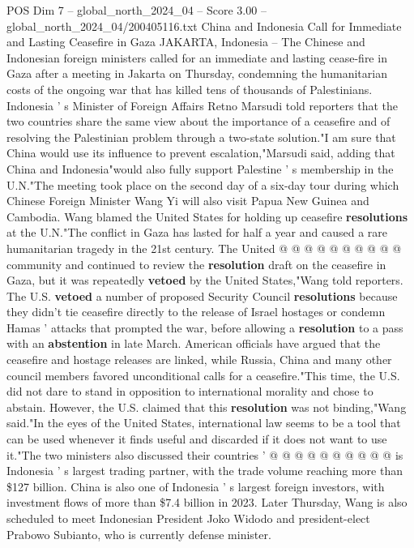 \begin{textsample}{POS Dim 7 – global\_north\_2024\_04 – Score 3.00 – global\_north\_2024\_04/200405116.txt}  \label{ex:f7_pos_223}
China and Indonesia Call for Immediate and Lasting Ceasefire in Gaza JAKARTA, Indonesia -- The Chinese and Indonesian foreign ministers called for an immediate and lasting cease-fire in Gaza after a meeting in Jakarta on Thursday, condemning the humanitarian costs of the ongoing war that has killed tens of thousands of Palestinians.
Indonesia ' s Minister of Foreign Affairs Retno Marsudi told reporters that the two countries share the same view about the importance of a ceasefire and of resolving the Palestinian problem through a two-state solution."I am sure that China would use its influence to prevent escalation,"Marsudi said, adding that China and Indonesia"would also fully support Palestine ' s membership in the U.N."The meeting took place on the second day of a six-day tour during which Chinese Foreign Minister Wang Yi will also visit Papua New Guinea and Cambodia.
Wang blamed the United States for holding up ceasefire \textbf{resolutions} at the U.N."The conflict in Gaza has lasted for half a year and caused a rare humanitarian tragedy in the 21st century.
The United @ @ @ @ @ @ @ @ @ @ community and continued to review the \textbf{resolution} draft on the ceasefire in Gaza, but it was repeatedly \textbf{vetoed} by the United States,"Wang told reporters.
The U.S. \textbf{vetoed} a number of proposed Security Council \textbf{resolutions} because they didn't tie ceasefire directly to the release of Israel hostages or condemn Hamas ' attacks that prompted the war, before allowing a \textbf{resolution} to a pass with an \textbf{abstention} in late March.
American officials have argued that the ceasefire and hostage releases are linked, while Russia, China and many other council members favored unconditional calls for a ceasefire."This time, the U.S. did not dare to stand in opposition to international morality and chose to abstain.
However, the U.S. claimed that this \textbf{resolution} was not binding,"Wang said."In the eyes of the United States, international law seems to be a tool that can be used whenever it finds useful and discarded if it does not want to use it."The two ministers also discussed their countries ' @ @ @ @ @ @ @ @ @ @ is Indonesia ' s largest trading partner, with the trade volume reaching more than \$127 billion.
China is also one of Indonesia ' s largest foreign investors, with investment flows of more than \$7.4 billion in 2023.
Later Thursday, Wang is also scheduled to meet Indonesian President Joko Widodo and president-elect Prabowo Subianto, who is currently defense minister.

\end{textsample}

